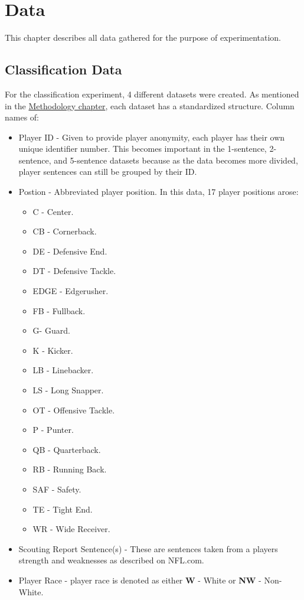 \documentclass[oneside,12pt]{Classes/RoboticsLaTeX}
\begin{document}
\chapter{Data}
\label{chap:data}
This chapter describes all data gathered for the purpose of experimentation.
\section{Classification Data}
\label{sec:class_data}
For the classification experiment, 4 different datasets were created. As mentioned in the \hyperref[chap:methodology]{Methodology chapter}, each dataset has a standardized structure. Column names of:
\begin{itemize}
  \item Player ID - Given to provide player anonymity, each player has their own unique identifier number. This becomes important in the 1-sentence, 2-sentence, and 5-sentence datasets because as the data becomes more divided, player sentences can
        still be grouped by their ID.
  \item Postion - Abbreviated player position. In this data, 17 player positions arose: \begin{itemize}
    \item C - Center.
    \item CB - Cornerback.
    \item DE - Defensive End.
    \item DT - Defensive Tackle.
    \item EDGE - Edgerusher.
    \item FB - Fullback.
    \item G- Guard.
    \item K - Kicker.
    \item LB - Linebacker.
    \item LS - Long Snapper.
    \item OT - Offensive Tackle.
    \item P - Punter.
    \item QB - Quarterback.
    \item RB - Running Back.
    \item SAF - Safety.
    \item TE - Tight End.
    \item WR - Wide Receiver.
  \end{itemize}
  \item Scouting Report Sentence(s) - These are sentences taken from a players strength and weaknesses as described on NFL.com.
  \item Player Race - player race is denoted as either \textbf{W} - White or \textbf{NW} - Non-White.
\end{itemize}
\end{document}

